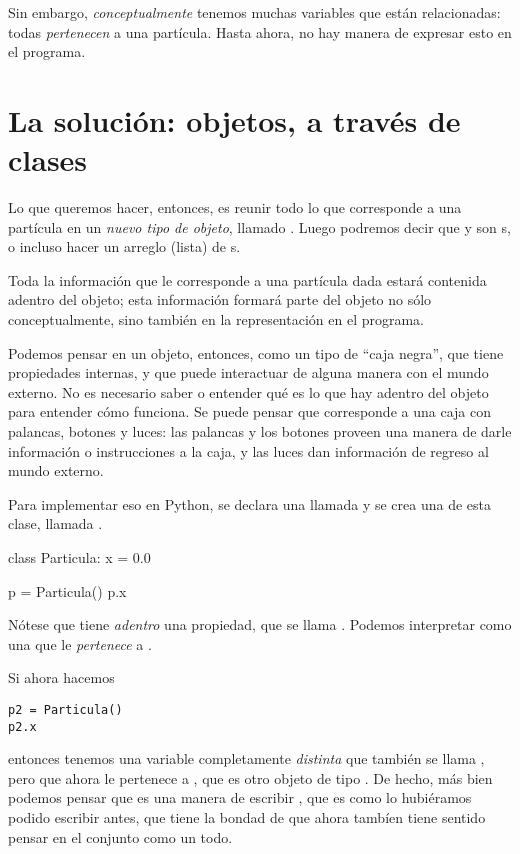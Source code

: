 Sin embargo, \emph{conceptualmente} tenemos muchas variables que están relacionadas: todas \emph{pertenecen} a una partícula.
Hasta ahora, no hay manera de expresar esto en el programa.

\section{La solución: objetos, a través de clases}

Lo que queremos hacer, entonces, es reunir todo lo que corresponde a una partícula en un \emph{nuevo tipo de objeto}, llamado .  Luego podremos decir que   y  son s, 
o incluso hacer un arreglo (lista) de s.

Toda la información que le corresponde a una partícula dada estará contenida adentro del objeto; esta información formará parte del objeto no sólo
conceptualmente, sino también en la representación en el programa. 

Podemos pensar en un objeto, entonces, como un tipo de ``caja negra'', que tiene propiedades internas, y que puede interactuar de alguna manera con el mundo externo. No es necesario saber o entender qué es lo que hay adentro del objeto para entender cómo funciona. Se puede pensar que corresponde a una caja con palancas, botones y luces: las palancas y los botones proveen una manera de darle información o instrucciones a la caja, y las luces dan información de regreso al mundo externo.

Para implementar eso en Python, se declara una  llamada  y se crea una  de esta clase, llamada .
\begin{python}
class Particula:
  x = 0.0
  
p = Particula()
p.x
\end{python}
Nótese que  tiene \emph{adentro} una propiedad, que se llama . Podemos interpretar  como una  que le \emph{pertenece} a  .

Si ahora hacemos
\begin{lstlisting}
p2 = Particula()
p2.x
\end{lstlisting}
entonces tenemos una variable completamente \emph{distinta} que también se llama , pero que ahora le pertenece a  , que es otro objeto de tipo  . De hecho, más bien podemos pensar que  es una manera de escribir , que es como lo hubiéramos podido escribir antes, que tiene la bondad de que ahora tambíen tiene sentido pensar en el conjunto  como un todo.

